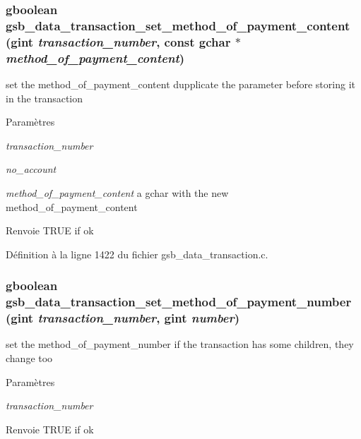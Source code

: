 \subsubsection[{gsb\_\-data\_\-transaction\_\-set\_\-method\_\-of\_\-payment\_\-content}]{\setlength{\rightskip}{0pt plus 5cm}gboolean gsb\_\-data\_\-transaction\_\-set\_\-method\_\-of\_\-payment\_\-content (gint {\em transaction\_\-number}, \/  const gchar $\ast$ {\em method\_\-of\_\-payment\_\-content})}\label{gsb__data__transaction_8c_ac4d8a66d20d37abac0fd3af84460921c}
set the method\_\-of\_\-payment\_\-content dupplicate the parameter before storing it in the transaction


\begin{DoxyParams}{Paramètres}
\item[{\em transaction\_\-number}]\item[{\em no\_\-account}]\item[{\em method\_\-of\_\-payment\_\-content}]a gchar with the new method\_\-of\_\-payment\_\-content \end{DoxyParams}
\begin{DoxyReturn}{Renvoie}
TRUE if ok 
\end{DoxyReturn}


Définition à la ligne 1422 du fichier gsb\_\-data\_\-transaction.c.

\subsubsection[{gsb\_\-data\_\-transaction\_\-set\_\-method\_\-of\_\-payment\_\-number}]{\setlength{\rightskip}{0pt plus 5cm}gboolean gsb\_\-data\_\-transaction\_\-set\_\-method\_\-of\_\-payment\_\-number (gint {\em transaction\_\-number}, \/  gint {\em number})}\label{gsb__data__transaction_8c_a2ec47094f3a4b930dc6057f574af8019}
set the method\_\-of\_\-payment\_\-number if the transaction has some children, they change too


\begin{DoxyParams}{Paramètres}
\item[{\em transaction\_\-number}]\item[{\em }]\end{DoxyParams}
\begin{DoxyReturn}{Renvoie}
TRUE if ok 
\end{DoxyReturn}


